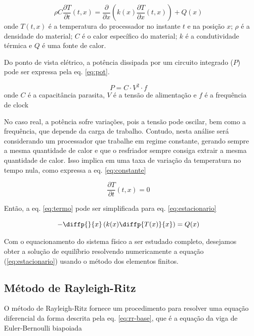 \documentclass[a4,12pt]{horizon-theme}
\begin{document}
\begin{equation}\label{eq:termo}
  \rho C\frac{\partial T}{\partial t}\left(t,x\right)=\frac{\partial }{\partial x}\left(k\left(x\right)\frac{\partial T}{\partial x}\left(t,x\right)\right)+Q\left(x\right)
\end{equation}
onde $T(t, x)$ é a temperatura do processador no instante $t$ e na posição $x$; $\rho$ é a densidade do material; $C$ é o calor específico do material; $k$ é a condutividade térmica e $Q$ é uma fonte de calor.

Do ponto de vista elétrico, a potência dissipada por um circuito integrado ($P$) pode ser expressa pela eq. \eqref{eq:pot}.

\begin{equation}\label{eq:pot}
  P = C \cdot V^2 \cdot f
\end{equation}
onde $C$ é a capacitância parasita, $V$ é a tensão de alimentação e $f$ é a frequência de clock

No caso real, a potência sofre variações, pois a tensão pode oscilar, bem como a frequência, que depende da carga de trabalho. Contudo, nesta análise será considerando um processador que trabalhe em regime constante, gerando sempre a mesma quantidade de calor e que o resfriador sempre consiga extrair a mesma quantidade de calor. Isso implica em uma taxa de variação da temperatura no tempo nula, como expressa a eq. \eqref{eq:constante}

\begin{equation}\label{eq:constante}
  \frac{\partial T}{\partial t}\left(t,x\right)=0
\end{equation}

Então, a eq. \eqref{eq:termo} pode ser simplificada para eq. \eqref{eq:estacionario}

\begin{equation} \label{eq:estacionario}
  -\diffp{}{x}\left(k(x)\diffp{T(x)}{x}\right) = Q(x)
\end{equation}

Com o equacionamento do sistema físico a ser estudado completo, desejamos obter a solução de equilíbrio resolvendo numericamente a equação (\ref{eq:estacionario}) usando o método dos elementos finitos.


\subsection{Método de Rayleigh-Ritz}
\label{sec:rr}

O método de Rayleigh-Ritz fornece um procedimento para resolver uma equação diferencial da forma descrita pela eq. \eqref{eq:rr-base}, que é a equação da viga de Euler-Bernoulli biapoiada
\end{document}
